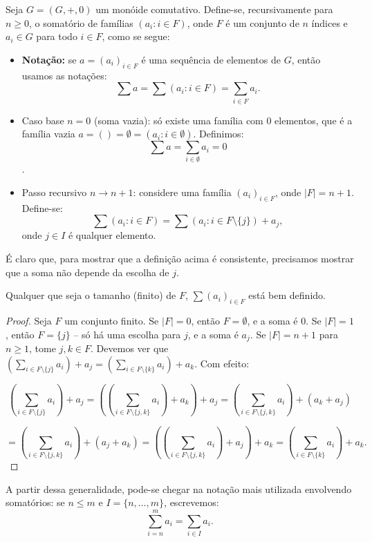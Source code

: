 \begin{definition}\label{def:group_sum}
Seja $G=(G, +, 0)$ um monóide comutativo.
Define-se, recursivamente para $n\geq 0$, o somatório de famílias $(a_i: i \in F)$, onde $F$ é um conjunto de $n$ índices e $a_i \in G$ para todo $i \in F$, como se segue:

\begin{itemize}
    \item \textbf{Notação:} se $a=(a_i)_{i\in F}$ é uma sequência de elementos de $G$, então usamos as notações:
    \[\sum a=\sum(a_i: i\in F)=\sum_{i\in F} a_i.\]
    \item Caso base $n=0$ (soma vazia): só existe uma família com $0$ elementos, que é a família vazia $a=()=\emptyset=(a_i:i\in \emptyset)$.
    Definimos: \[\sum a=\sum_{i \in \emptyset}a_i=0\].
    \item Passo recursivo $n\rightarrow n+1$: considere uma família $(a_i)_{i\in F}$, onde $|F|=n+1$.
    Define-se:
    \[\sum(a_i: i \in F)=\sum(a_i: i \in F\setminus\{j\})+a_j,\]
    onde $j \in I$ é qualquer elemento.
\end{itemize}
\end{definition}
É claro que, para mostrar que a definição acima é consistente, precisamos mostrar que a soma não depende da escolha de $j$.

\begin{lemma}
Qualquer que seja o tamanho (finito) de $F$, $\sum(a_i)_{i\in F}$ está bem definido.
\end{lemma}

\begin{proof}
    Seja $F$ um conjunto finito.
Se $|F|=0$, então $F=\emptyset$, e a soma é $0$.
Se $|F|=1$, então $F=\{j\}$ -- só há uma escolha para $j$, e a soma é $a_j$.
    Se $|F|=n+1$ para $n\geq 1$, tome $j, k \in F$.
    Devemos ver que $\left(\sum_{i\in F\setminus\{j\}} a_i\right)+a_j=\left(\sum_{i\in F\setminus\{k\}} a_i\right)+a_k$.
    Com efeito:

    \[\left(\sum_{i\in F\setminus\{j\}} a_i\right)+a_j=\left(\left(\sum_{i\in F\setminus\{j, k\}} a_i\right)+a_k\right)+a_j=\left(\sum_{i\in F\setminus\{j, k\}} a_i\right)+(a_k+a_j)\]

    \[=\left(\sum_{i\in F\setminus\{j, k\}} a_i\right)+(a_j+a_k)=\left(\left(\sum_{i\in F\setminus\{j, k\}} a_i\right)+a_j\right)+a_k=\left(\sum_{i\in F\setminus\{k\}} a_i\right)+a_k.\]
\end{proof}

A partir dessa generalidade, pode-se chegar na notação mais utilizada envolvendo somatórios: se $n\leq m$ e $I=\{n, \dots, m\}$, escrevemos:
\[\sum_{i=n}^m a_i=\sum_{i\in I} a_i.\]


